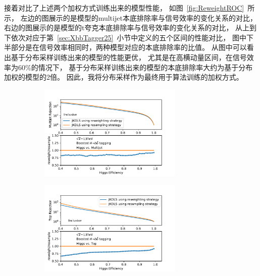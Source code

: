 接着对比了上述两个加权方式训练出来的模型性能，
如图~\ref{fig:ReweightROC}~所示，
左边的图展示的是模型的multijet本底排除率与信号效率的变化关系的对比，
右边的图展示的是模型的t夸克本底排除率与信号效率的变化关系的对比，
从上到下依次对应于第~\ref{sec:XbbTagger25}~小节中定义的五个区间的性能对比，
图中下半部分是在信号效率相同时，两种模型对应的本底排除率的比值。
从图中可以看出基于分布采样训练出来的模型的性能更优，
尤其是在高横动量区间，在信号效率为60\%的情况下，
基于分布采样训练出来的模型的本底排除率大约为基于分布加权的模型的2倍。
因此，我将分布采样作为最终用于算法训练的加权方式。

\begin{figure}[htbp]
  \begin{subfigure}{.5\textwidth}
  \centering
   \includegraphics[width=0.75\textwidth]{figuresXbb/Reweight/QCDIN.pdf}
   \caption{}
  \end{subfigure}
  \begin{subfigure}{.5\textwidth}
  \centering
   \includegraphics[width=0.75\textwidth]{figuresXbb/Reweight/TOPIN.pdf}
   \caption{}
  \end{subfigure}
\newline 
   \begin{subfigure}{.5\textwidth}

\end{subfigure}
\end{figure}
